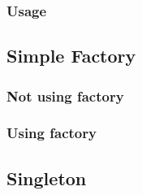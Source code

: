 \documentclass[10pt,letterpaper]{article}
\begin{document}
\subsubsection{Usage}
\label{code:coi-usage}

\subsection{Simple Factory}
\label{code:simple-factory}
\subsubsection{Not using factory}

\subsubsection{Using factory}


\subsection{Singleton}
\label{code:singleton}

\end{document}

